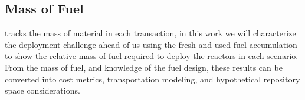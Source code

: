 \subsection{Mass of Fuel}
\label{sec:mass_of_fuel}

\cyclus tracks the mass of material in each transaction, in this work we will characterize the deployment challenge ahead of us using the fresh and used fuel accumulation to show the relative mass of fuel required to deploy the reactors in each scenario. From the mass of fuel, and knowledge of the fuel design, these results can be converted into cost metrics, transportation modeling, and hypothetical repository space considerations.